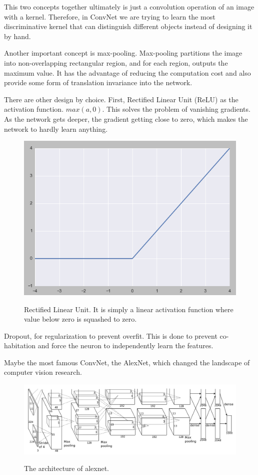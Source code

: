 \documentclass[a4paper,11pt]{kth-mag}
\begin{document}
This two concepts together ultimately is just a convolution operation of an image with a kernel. Therefore, in ConvNet we are trying to learn the most discriminative kernel that can distinguish different objects instead of designing it by hand.

Another important concept is max-pooling. Max-pooling partitions the image into non-overlapping rectangular region, and for each region, outputs the maximum value. It has the advantage of reducing the computation cost and also provide some form of translation invariance into the network.

There are other design by choice.
First, Rectified Linear Unit (ReLU) as the activation function. $max(a, 0)$. This solves the problem of vanishing gradients. As the network gets deeper, the gradient getting close to zero, which makes the network to hardly learn anything.

\begin{figure}
\centering
\includegraphics[scale=0.5]{image/relu.png}
\label{fig:relu}
\caption{Rectified Linear Unit. It is simply a linear activation function where value below zero is squashed to zero.}
\end{figure}

Dropout, for regularization to prevent overfit. This is done to prevent co-habitation and force the neuron to independently learn the features.

Maybe the most famous ConvNet, the AlexNet, which changed the landscape of computer vision research.
\begin{figure}
\centering
\includegraphics[scale=0.35]{image/alexnet.png}
\label{fig:alexnet}
\caption{The architecture of alexnet.}
\end{figure}
\end{document}
